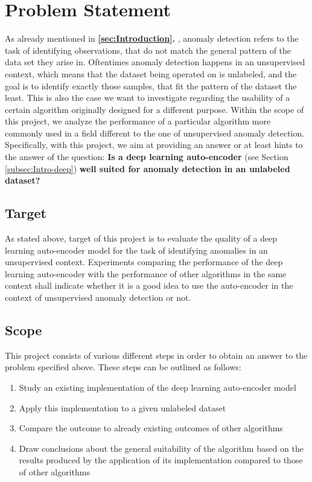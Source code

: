\documentclass{vldb}
\begin{document}


\section{Problem Statement} \label{problem_statement}
As already mentioned in \textbf{\ref{sec:Introduction}. }, anomaly detection refers to the task of identifying observations, that do not match the general pattern of the data set they arise in. Oftentimes anomaly detection happens in an unsupervised context, which means that the dataset being operated on is unlabeled, and the goal is to identify exactly those samples, that fit the pattern of the dataset the least. This is also the case we want to investigate regarding the usability of a certain algorithm originally designed for a different purpose. Within the scope of this project, we analyze the performance of a particular algorithm more commonly used in a field different to the one of unsupervised anomaly detection. Specifically, with this project, we aim at providing an answer or at least hints to the answer of the question: \textbf{Is a deep learning auto-encoder} (see Section \ref{subsec:Intro-deep}) \textbf{well suited for anomaly detection in an unlabeled dataset?}


\subsection{Target}\label{target}
As stated above, target of this project is to evaluate the quality of a deep learning auto-encoder model for the task of identifying anomalies in an unsupervised context. Experiments comparing the performance of the deep learning auto-encoder with the performance of other algorithms in the same context shall indicate whether it is a good idea to use the auto-encoder in the context of unsupervised anomaly detection or not.


\subsection{Scope}\label{ssec:scope}
This project consists of various different steps in order to obtain an answer to the problem specified above.
These steps can be outlined as follows:
\begin{enumerate}
	\item Study an existing implementation of the deep learning auto-encoder model
	\item Apply this implementation to a given unlabeled dataset
	\item Compare the outcome to already existing outcomes of other algorithms
	\item Draw conclusions about the general suitability of the algorithm based on the results produced by the application of its implementation compared to those of other algorithms
\end{enumerate}
\end{document}
